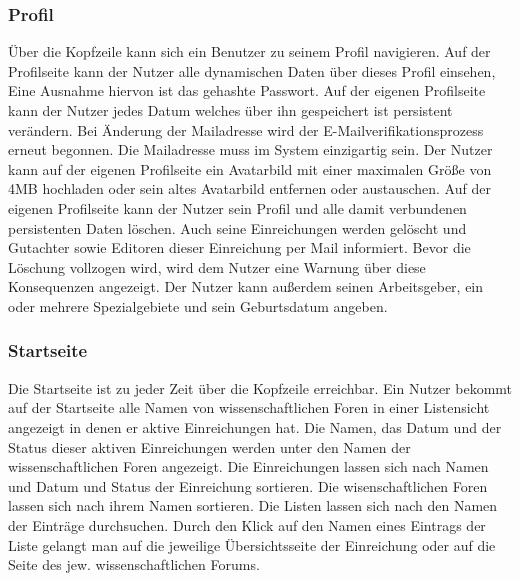 \subsubsection{Profil}
\begin{description}
     Über die Kopfzeile kann sich ein Benutzer zu seinem Profil navigieren.
     Auf der Profilseite kann der Nutzer alle dynamischen Daten über dieses Profil einsehen,
    Eine Ausnahme hiervon ist das gehashte Passwort. %
     Auf der eigenen Profilseite kann der Nutzer jedes Datum %
    welches über ihn gespeichert ist persistent verändern.
     Bei Änderung der Mailadresse wird der E-Mailverifikationsprozess erneut
    begonnen. Die Mailadresse muss im System einzigartig sein. %
     Der Nutzer kann auf der eigenen Profilseite ein Avatarbild mit einer maximalen
    Größe von 4MB hochladen oder sein altes Avatarbild entfernen oder austauschen. %
     Auf der eigenen Profilseite kann der Nutzer sein Profil und alle damit verbundenen persistenten
    Daten löschen. Auch seine Einreichungen werden gelöscht und Gutachter sowie Editoren dieser
    Einreichung per Mail informiert. Bevor die Löschung vollzogen wird, wird dem Nutzer
    eine Warnung über diese Konsequenzen angezeigt.
     Der Nutzer kann außerdem seinen Arbeitsgeber, ein oder mehrere Spezialgebiete
    und sein Geburtsdatum angeben.
\end{description}

\subsubsection{Startseite}
\begin{description}
     Die Startseite ist zu jeder Zeit über die Kopfzeile erreichbar.
     Ein Nutzer bekommt auf der Startseite alle Namen von wissenschaftlichen Foren
    in einer Listensicht angezeigt in denen er aktive Einreichungen hat.
    Die Namen, das Datum und der Status dieser aktiven Einreichungen werden unter den Namen der wissenschaftlichen
    Foren angezeigt.
     Die Einreichungen lassen sich nach Namen und Datum und Status
    der Einreichung sortieren. Die wisenschaftlichen Foren lassen sich nach ihrem Namen sortieren.
     Die Listen lassen sich nach den Namen der Einträge durchsuchen.
     Durch den Klick auf den Namen eines Eintrags der Liste gelangt man auf die jeweilige Übersichtsseite
    der Einreichung oder auf die Seite des jew. wissenschaftlichen Forums.
\end{description}

